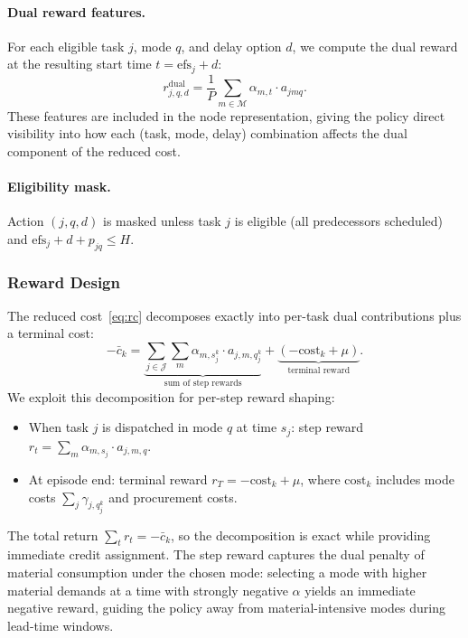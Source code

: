 \documentclass[11pt]{article}
\newcommand{\calJ}{\mathcal{J}}
\newcommand{\calM}{\mathcal{M}}
\begin{document}
\paragraph{Dual reward features.}
For each eligible task $j$, mode $q$, and delay option $d$, we compute the dual reward at the resulting start time $t = \mathrm{efs}_j + d$:
\begin{equation}\label{eq:dual-feat}
    r^{\text{dual}}_{j,q,d} = \frac{1}{P} \sum_{m \in \calM} \alpha_{m,t} \cdot a_{jmq}.
\end{equation}
These features are included in the node representation, giving the policy direct visibility into how each (task, mode, delay) combination affects the dual component of the reduced cost.

\paragraph{Eligibility mask.}
Action $(j, q, d)$ is masked unless task $j$ is eligible (all predecessors scheduled) and $\mathrm{efs}_j + d + p_{jq} \leq H$.

\subsubsection{Reward Design}

The reduced cost~\eqref{eq:rc} decomposes exactly into per-task dual contributions plus a terminal cost:
\begin{equation}\label{eq:reward-decomp}
    -\bar{c}_k = \underbrace{\sum_{j \in \calJ} \sum_m \alpha_{m, s_j^k} \cdot a_{j,m,q_j^k}}_{\text{sum of step rewards}} + \underbrace{(-\mathrm{cost}_k + \mu)}_{\text{terminal reward}}.
\end{equation}
We exploit this decomposition for per-step reward shaping:
\begin{itemize}
    \item When task $j$ is dispatched in mode $q$ at time $s_j$: step reward $r_t = \sum_m \alpha_{m, s_j} \cdot a_{j,m,q}$.
    \item At episode end: terminal reward $r_T = -\mathrm{cost}_k + \mu$, where $\mathrm{cost}_k$ includes mode costs $\sum_j \gamma_{j,q_j^k}$ and procurement costs.
\end{itemize}
The total return $\sum_t r_t = -\bar{c}_k$, so the decomposition is exact while providing immediate credit assignment.
The step reward captures the dual penalty of material consumption under the chosen mode: selecting a mode with higher material demands at a time with strongly negative $\alpha$ yields an immediate negative reward, guiding the policy away from material-intensive modes during lead-time windows.
\end{document}
